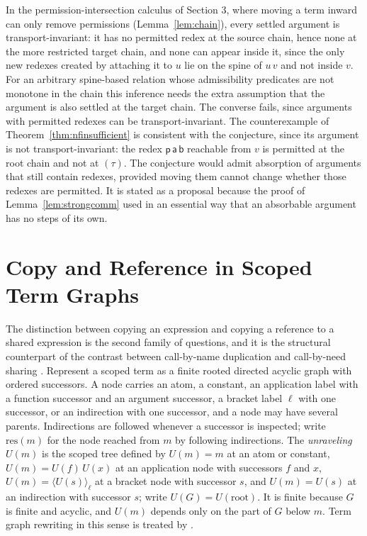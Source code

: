 \documentclass[11pt]{article}
\theoremstyle{definition}
\theoremstyle{remark}
\newcommand{\br}[2]{\langle #1\rangle_{#2}}
\begin{document}
In the permission-intersection calculus of Section 3, where moving a term inward can only remove permissions (Lemma~\ref{lem:chain}), every settled argument is transport-invariant: it has no permitted redex at the source chain, hence none at the more restricted target chain, and none can appear inside it, since the only new redexes created by attaching it to $u$ lie on the spine of $u\,v$ and not inside $v$. For an arbitrary spine-based relation whose admissibility predicates are not monotone in the chain this inference needs the extra assumption that the argument is also settled at the target chain. The converse fails, since arguments with permitted redexes can be transport-invariant. The counterexample of Theorem~\ref{thm:nfinsufficient} is consistent with the conjecture, since its argument is not transport-invariant: the redex $\mathsf p\,\mathsf a\,\mathsf b$ reachable from $v$ is permitted at the root chain and not at $(\tau)$. The conjecture would admit absorption of arguments that still contain redexes, provided moving them cannot change whether those redexes are permitted. It is stated as a proposal because the proof of Lemma~\ref{lem:strongcomm} used in an essential way that an absorbable argument has no steps of its own.

\section{Copy and Reference in Scoped Term Graphs}

The distinction between copying an expression and copying a reference to a shared expression is the second family of questions, and it is the structural counterpart of the contrast between call-by-name duplication and call-by-need sharing \citep{wadsworth1971,ariola1997}. Represent a scoped term as a finite rooted directed acyclic graph with ordered successors. A node carries an atom, a constant, an application label with a function successor and an argument successor, a bracket label $\ell$ with one successor, or an indirection with one successor, and a node may have several parents. Indirections are followed whenever a successor is inspected; write $\mathrm{res}(m)$ for the node reached from $m$ by following indirections. The \emph{unraveling} $U(m)$ is the scoped tree defined by $U(m)=m$ at an atom or constant, $U(m)=U(f)\,U(x)$ at an application node with successors $f$ and $x$, $U(m)=\br{U(s)}\ell$ at a bracket node with successor $s$, and $U(m)=U(s)$ at an indirection with successor $s$; write $U(G)=U(\mathrm{root})$. It is finite because $G$ is finite and acyclic, and $U(m)$ depends only on the part of $G$ below $m$. Term graph rewriting in this sense is treated by \citet{barendregt1987}.
\end{document}
